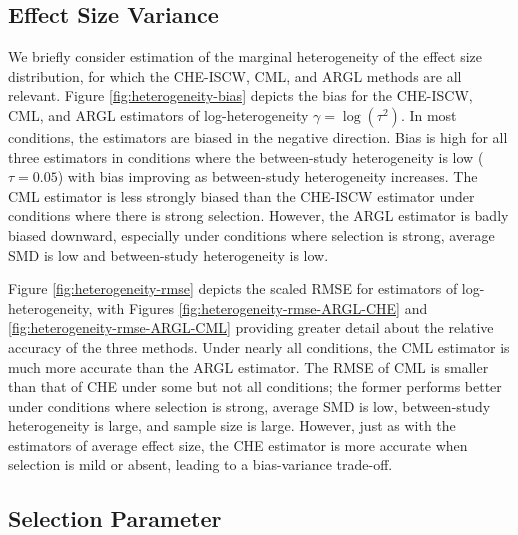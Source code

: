 \documentclass[
  american,
  man, donotrepeattitle,floatsintext]{apa7}
\begin{document}
\subsection{Effect Size Variance}\label{effect-size-variance}

We briefly consider estimation of the marginal heterogeneity of the effect size distribution, for which the CHE-ISCW, CML, and ARGL methods are all relevant.
Figure \ref{fig:heterogeneity-bias} depicts the bias for the CHE-ISCW, CML, and ARGL estimators of log-heterogeneity \(\gamma = \log(\tau^2)\).
In most conditions, the estimators are biased in the negative direction.
Bias is high for all three estimators in conditions where the between-study heterogeneity is low (\(\tau = 0.05\)) with bias improving as between-study heterogeneity increases. The CML estimator is less strongly biased than the CHE-ISCW estimator under conditions where there is strong selection.
However, the ARGL estimator is badly biased downward, especially under conditions where selection is strong, average SMD is low and between-study heterogeneity is low.

Figure \ref{fig:heterogeneity-rmse} depicts the scaled RMSE for estimators of log-heterogeneity, with Figures \ref{fig:heterogeneity-rmse-ARGL-CHE} and \ref{fig:heterogeneity-rmse-ARGL-CML} providing greater detail about the relative accuracy of the three methods.
Under nearly all conditions, the CML estimator is much more accurate than the ARGL estimator.
The RMSE of CML is smaller than that of CHE under some but not all conditions; the former performs better under conditions where selection is strong, average SMD is low, between-study heterogeneity is large, and sample size is large.
However, just as with the estimators of average effect size, the CHE estimator is more accurate when selection is mild or absent, leading to a bias-variance trade-off.

\subsection{Selection Parameter}\label{selection-parameter}
\end{document}
